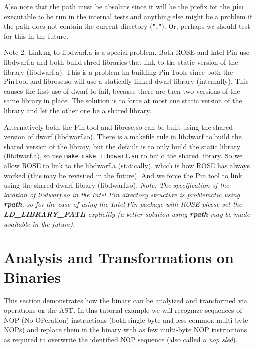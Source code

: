 Also note that the path must be absolute since it will be the
prefix for the {\bf pin} executable to be run in the internal tests and
anything else might be a problem if the path does not contain the 
current directory ({\bf "."}). Or, perhaps we should test for this
in the future.

Note 2: Linking to libdwarf.a is a special problem.  
Both ROSE and Intel Pin use libdwarf.a and both build shred libraries 
that link to the static version of the library (libdwarf.a).  This is 
a problem im building Pin Tools since both the PinTool and librose.so will use 
a statically linked dwarf library (internally).  This causes the first
use of dwarf to fail, because there are then two versions of the same 
library in place.  The solution is to force at most one static version 
of the library and let the other one be a shared library.

   Alternatively both the Pin tool and librose.so can be
built using the shared version of dwarf (libdwarf.so).
There is a makefile rule in libdwarf to build the shared
version of the library, but the default is to only build the
static library (libdwarf.a), so use {\tt make make libdwarf.so}
to build the shared library.  So we allow ROSE to link to
the libdwarf.a (statically), which is how ROSE has always
worked (this may be revisited in the future).  And we force 
the Pin tool to link using the shared dwarf library (libdwarf.so).
{\em Note: The specification of the location of libdwarf.so in the Intel Pin 
directory structure is problematic using {\bf rpath}, so for the case of 
using the Intel Pin package with ROSE please set the {\bf LD\_LIBRARY\_PATH}
explicitly (a better solution using {\bf rpath} may be made available in 
the future).}


 
\section{Analysis and Transformations on Binaries}

   This section demonstrates how the binary can be analyized and
transformed via operations on the AST. In this tutorial example we will
recognize sequences of NOP (No OPeration) instructions (both single byte
and less common multi-byte NOPs) and replace them in the binary with as 
few multi-byte NOP instructions as required to overwrite the identified
NOP sequence (also called a {\em nop sled}).

